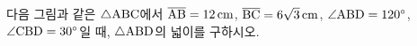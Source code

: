 다음 그림과 같은 $\triangle\mathrm{ABC}$에서 $\overline{\mathrm{AB}}=12\,\mathrm{cm}$, $\overline{\mathrm{BC}}=6\sqrt{3}\,\mathrm{cm}$, $\angle\mathrm{ABD}=120^\circ$, $\angle\mathrm{CBD}=30^\circ$일 때, $\triangle\mathrm{ABD}$의 넓이를 구하시오.
\par\smallskip\begin{center}\resizebox{\ifdim\width>\linewidth\linewidth\else\width\fi}{!}{}\end{center}
